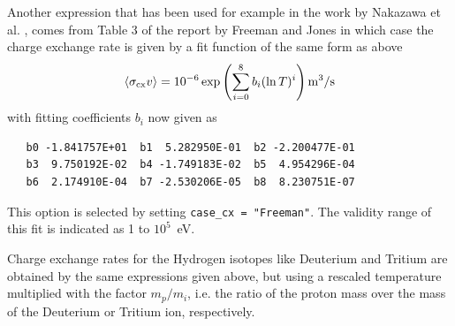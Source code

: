 \documentclass[amsmath,amssymb,a4]{revtex4-2}
\begin{document}
Another expression that has been used for example in the work by Nakazawa et al. \cite{nakazawa2000}, comes from Table 3 of the report by Freeman and Jones \cite{freeman1974} in which case the charge exchange rate is given by a fit function of the same form as above
\begin{equation}\label{charge_exchange_FJ}
    \langle\sigma_{\rm cx} v\rangle = 10^{-6} \exp\left( \sum_{i=0}^8 b_i (\ln T)^i \right)  {\rm m}^3/{\rm s}
\end{equation}
with fitting coefficients $b_i$ now given as
\begin{small}\begin{verbatim}
   b0 -1.841757E+01  b1  5.282950E-01  b2 -2.200477E-01
   b3  9.750192E-02  b4 -1.749183E-02  b5  4.954296E-04
   b6  2.174910E-04  b7 -2.530206E-05  b8  8.230751E-07
\end{verbatim}\end{small}
This option is selected by setting {\tt case\_cx = "Freeman"}. The validity range of this fit is indicated as 1 to $10^5$~eV.

Charge exchange rates for the Hydrogen isotopes like Deuterium and Tritium are obtained by the same expressions given above, but using a rescaled temperature multiplied with the factor $m_p/m_i$, i.e. the ratio of the proton mass over the mass of the Deuterium or Tritium ion, respectively.
\end{document}
